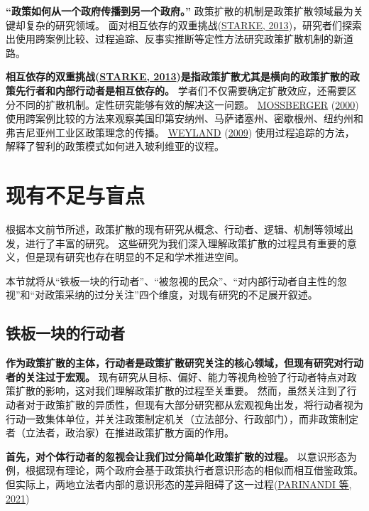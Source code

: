 \documentclass[
  12pt,
]{ctexart}
\begin{document}
\textbf{``政策如何从一个政府传播到另一个政府。''}
政策扩散的机制是政策扩散领域最为关键却复杂的研究领域。
面对相互依存的双重挑战(\protect\hyperlink{ref-Starke2013}{STARKE, 2013})，研究者们探索出使用跨案例比较、过程追踪、反事实推断等定性方法研究政策扩散机制的新道路。

\textbf{相互依存的双重挑战(\protect\hyperlink{ref-Starke2013}{STARKE, 2013})是指政策扩散尤其是横向的政策扩散的政策先行者和内部行动者是相互依存的。}
学者们不仅需要确定扩散效应，还需要区分不同的扩散机制。定性研究能够有效的解决这一问题。
\protect\hyperlink{ref-Mossberger2000}{MOSSBERGER} (\protect\hyperlink{ref-Mossberger2000}{2000}) 使用跨案例比较的方法来观察美国印第安纳州、马萨诸塞州、密歇根州、纽约州和弗吉尼亚州工业区政策理念的传播。
\protect\hyperlink{ref-Weyland2009}{WEYLAND} (\protect\hyperlink{ref-Weyland2009}{2009}) 使用过程追踪的方法，解释了智利的政策模式如何进入玻利维亚的议程。

\newpage

\hypertarget{ux73b0ux6709ux4e0dux8db3ux4e0eux76f2ux70b9}{%
\section{现有不足与盲点}\label{ux73b0ux6709ux4e0dux8db3ux4e0eux76f2ux70b9}}

根据本文前节所述，政策扩散的现有研究从概念、行动者、逻辑、机制等领域出发，进行了丰富的研究。
这些研究为我们深入理解政策扩散的过程具有重要的意义，但是现有研究也存在明显的不足和学术推进空间。

本节就将从``铁板一块的行动者''、``被忽视的民众''、``对内部行动者自主性的忽视''和``对政策采纳的过分关注''四个维度，对现有研究的不足展开叙述。

\hypertarget{ux94c1ux677fux4e00ux5757ux7684ux884cux52a8ux8005}{%
\subsection{铁板一块的行动者}\label{ux94c1ux677fux4e00ux5757ux7684ux884cux52a8ux8005}}

\textbf{作为政策扩散的主体，行动者是政策扩散研究关注的核心领域，但现有研究对行动者的关注过于宏观。}
现有研究从目标、偏好、能力等视角检验了行动者特点对政策扩散的影响，这对我们理解政策扩散的过程至关重要。
然而，虽然关注到了行动者对于政策扩散的异质性，但现有大部分研究都从宏观视角出发，将行动者视为行动一致集体单位，并关注政策制定机关（立法部分、行政部门），而非政策制定者（立法者，政治家）在推进政策扩散方面的作用。

\textbf{首先，对个体行动者的忽视会让我们过分简单化政策扩散的过程。}
以意识形态为例，根据现有理论，两个政府会基于政策执行者意识形态的相似而相互借鉴政策。
但实际上，两地立法者内部的意识形态的差异阻碍了这一过程(\protect\hyperlink{ref-ParinandiEtAl2021}{PARINANDI 等, 2021})
\end{document}
